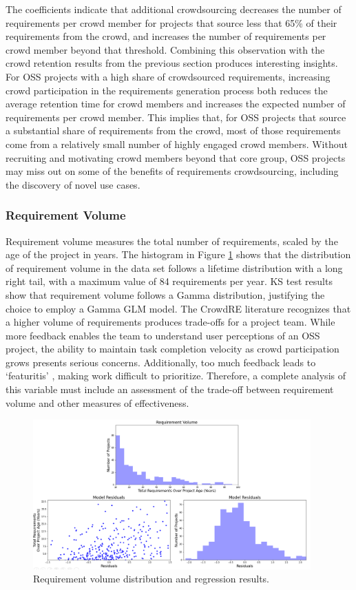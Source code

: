 The coefficients indicate that additional crowdsourcing decreases the number of requirements per crowd member for projects that source less that 65\% of their requirements from the crowd, and increases the number of requirements per crowd member beyond that threshold. Combining this observation with the crowd retention results from the previous section produces interesting insights. For OSS projects with a high share of crowdsourced requirements, increasing crowd participation in the requirements generation process both reduces the average retention time for crowd members and increases the expected number of requirements per crowd member. This implies that, for OSS projects that source a substantial share of requirements from the crowd, most of those requirements come from a relatively small number of highly engaged crowd members. Without recruiting and motivating crowd members beyond that core group, OSS projects may miss out on some of the benefits of requirements crowdsourcing, including the discovery of novel use cases.

\subsubsection{Requirement Volume}

Requirement volume measures the total number of requirements, scaled by the age of the project in years. The histogram in Figure \ref{requirement_volume_results} shows that the distribution of requirement volume in the data set follows a lifetime distribution with a long right tail, with a maximum value of 84 requirements per year. KS test results show that requirement volume follows a Gamma distribution, justifying the choice to employ a Gamma GLM model. The CrowdRE literature \cite{groen} recognizes that a higher volume of requirements produces trade-offs for a project team. While more feedback enables the team to understand user perceptions of an OSS project, the ability to maintain task completion velocity as crowd participation grows presents serious concerns. Additionally, too much feedback leads to `featuritis' \cite{glinz}, making work difficult to prioritize. Therefore, a complete analysis of this variable must include an assessment of the trade-off between requirement volume and other measures of effectiveness.

\begin{figure}
  \includegraphics[width=0.95\textwidth]{issue_volume_results.PNG}
\caption{Requirement volume distribution and regression results.}
\label{requirement_volume_results}
\end{figure}

